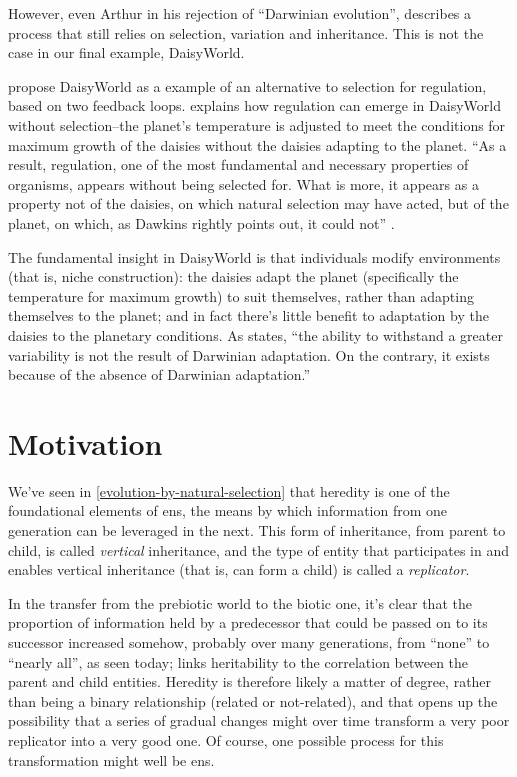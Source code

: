 However, even Arthur in his rejection of ``Darwinian evolution'', describes a process that still relies on selection, variation and inheritance. This is not the case in our final example, DaisyWorld.

\Textcite{LovelockMargulis2011} propose DaisyWorld as a example of an alternative to selection for regulation, based on two feedback loops. \Textcite{Saunders1994} explains how regulation can emerge in DaisyWorld without selection--the planet's temperature is adjusted to meet the conditions for maximum growth of the daisies without the daisies adapting to the planet. ``As a result, regulation, one of the most fundamental and necessary properties of organisms, appears without being selected for. What is more, it appears as a property not of the daisies, on which natural selection may have acted, but of the planet, on which, as Dawkins rightly points out, it could not'' \parencite{Saunders1994}.

The fundamental insight in DaisyWorld is that individuals modify environments (that is, niche construction): the daisies adapt the planet (specifically the temperature for maximum growth) to suit themselves, rather than adapting themselves to the planet; and in fact there's little benefit to adaptation by the daisies to the planetary conditions. As \textcite{Saunders1994} states, ``the ability to withstand a greater variability is not the result of Darwinian adaptation. On the contrary, it exists because of the absence of Darwinian adaptation.''

\section{Motivation}\label{previous-work}

We’ve seen in \cref{evolution-by-natural-selection} that heredity is one of the foundational elements of \gls{ens}, the means by which information from one generation can be leveraged in the next. This form of inheritance, from parent to child, is called \emph{vertical} inheritance, and the type of entity that participates in and enables vertical inheritance (that is, can form a child) is called a \emph{replicator}. 

In the transfer from the prebiotic world to the biotic one, it’s clear that the proportion of information held by a predecessor that could be passed on to its successor increased somehow, probably over many generations, from ``none'' to ``nearly all'', as seen today; \textcite{Vasas2012a} links heritability to the correlation between the parent and child entities. Heredity is therefore likely a matter of degree, rather than being a binary relationship (related or not-related), and that opens up the possibility that a series of gradual changes might over time transform a very poor replicator into a very good one. Of course, one possible process for this transformation might well be \gls{ens}.

